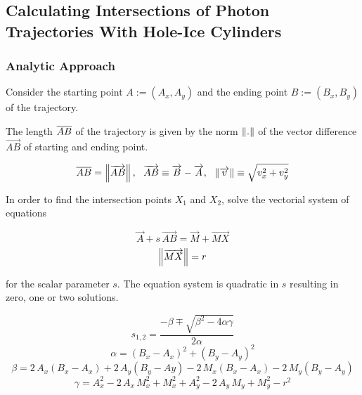 \subsection{Calculating Intersections of Photon Trajectories With Hole-Ice Cylinders}
\label{sec:intersections}

\subsubsection{Analytic Approach}\label{analytic-approach}


Consider the starting point \(A := (A_x, A_y)\) and the ending point
\(B := (B_x, B_y)\) of the trajectory.

The length \(\overline{AB}\) of the trajectory is given by the norm
\(\left\lVert.\right\rVert\) of the vector difference \(\vec{AB}\) of starting and
ending point.

\begin{equation} \notag
  \overline{AB} = \left\lVert\overrightarrow{AB}\right\rVert, \ \ \overrightarrow{AB} \equiv \overrightarrow{B} - \overrightarrow{A}, \ \ \left\lVert\overrightarrow{v}\right\rVert \equiv \sqrt{v_x^2 + v_y^2}
\end{equation}

In order to find the intersection points \(X_1\) and \(X_2\), solve the
vectorial system of equations

\begin{equation}
  \vec{A} + s \, \vec{AB} = \vec{M} + \vec{MX}
\end{equation}\begin{equation}
  \left\lVert\overrightarrow{MX}\right\rVert = r
\end{equation}

for the scalar parameter \(s\). The equation system is quadratic in
\(s\) resulting in zero, one or two solutions.

\begin{equation}
  s_{1,2} = \frac{-\beta \mp \sqrt{\beta^2 - 4\alpha\gamma}}{2\alpha}
\end{equation}\begin{equation}
  \alpha = (B_x - A_x)^2 + (B_y - A_y)^2
\end{equation}\begin{equation}
  \beta = 2\,A_x(B_x-A_x) + 2\,A_y(B_y-Ay) - 2\,M_x(B_x-A_x) - 2\,M_y(B_y-A_y)
\end{equation}\begin{equation}
  \gamma = A_x^2 - 2\,A_x\,M_x^2 + M_x^2 + A_y^2 - 2\,A_y\,M_y + M_y^2 - r^2
\end{equation}

